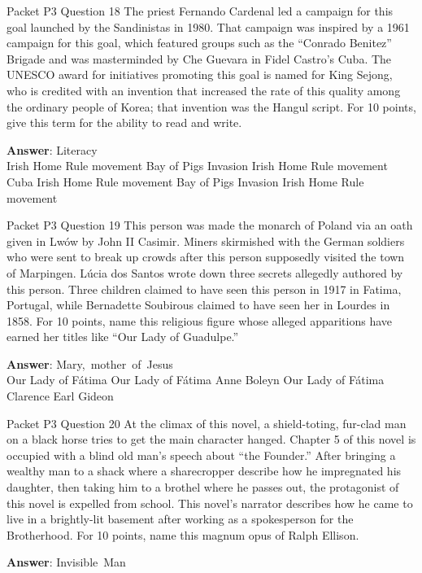 \begin{frame}{Packet P3 Question 18}
The priest Fernando Cardenal led a campaign for this goal launched by the Sandinistas in 1980. That campaign was inspired by a 1961 campaign for this goal, which   featured groups such as the “Conrado Benitez” Brigade and was masterminded by Che Guevara in Fidel Castro’s   Cuba. The UNESCO award for initiatives promoting this goal is named for   King Sejong, who is credited with an invention that increased the rate of this quality among the ordinary people of Korea; that invention was the Hangul script. For 10 points, give this term for the ability to read and write.        

\textbf{Answer}: Literacy\\
 Irish Home Rule movement
 Bay of Pigs Invasion
 Irish Home Rule movement
 Cuba
 Irish Home Rule movement
 Bay of Pigs Invasion
 Irish Home Rule movement
\end{frame}

\begin{frame}{Packet P3 Question 19}
This person was made the monarch of Poland via an oath given in Lwów by John II Casimir. Miners skirmished with the German soldiers who were sent to break up crowds after this person supposedly visited the town of Marpingen. Lúcia dos Santos wrote down three secrets allegedly authored by this person.   Three children claimed to have seen this person in 1917 in Fatima, Portugal, while Bernadette Soubirous claimed to have seen her in Lourdes in 1858. For 10 points, name this religious figure whose alleged apparitions have earned her titles like “Our Lady of Guadulpe.”        

\textbf{Answer}: Mary,\ mother\ of\ Jesus\\
 Our Lady of Fátima
 Our Lady of Fátima
 Anne Boleyn
 Our Lady of Fátima
 Clarence Earl Gideon
\end{frame}

\begin{frame}{Packet P3 Question 20}
At the climax of this novel, a shield-toting, fur-clad man on a black horse tries to get the main character hanged. Chapter 5 of this novel is occupied with a blind old man’s speech about “the Founder.” After bringing a wealthy man to a shack where a sharecropper describe how he impregnated his daughter, then taking him   to a brothel where he passes out, the protagonist of this novel is expelled from school. This novel’s narrator describes how he came to live in a brightly-lit basement after working as a spokesperson for the Brotherhood.   For 10 points, name this magnum opus of Ralph Ellison.    

\textbf{Answer}: Invisible\ Man\\
\end{frame}

